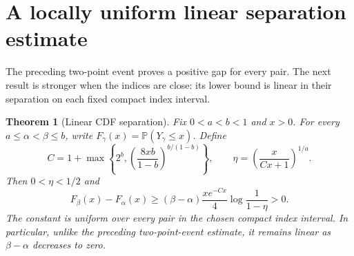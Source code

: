 \documentclass[11pt,a4paper]{article}
\newtheorem{theorem}{Theorem}[section]
\begin{document}
\section{A locally uniform linear separation estimate}\label{sec:linear}
The preceding two-point event proves a positive gap for every pair.
The next result is stronger when the indices are close: its lower bound
is linear in their separation on each fixed compact index interval.

\begin{theorem}[Linear CDF separation]\label{thm:linear}
Fix $0<a<b<1$ and $x>0$. For every
$a\leq\alpha<\beta\leq b$, write
$F_\gamma(x)=\mathbb P(Y_\gamma\leq x)$. Define
\[
 C=1+\max\left\{2^b,
       \left(\frac{8xb}{1-b}\right)^{b/(1-b)}\right\},
 \qquad
 \eta=\left(\frac{x}{Cx+1}\right)^{1/a}.
\]
Then $0<\eta<1/2$ and
\[
 F_\beta(x)-F_\alpha(x)
 \geq (\beta-\alpha)\frac{x e^{-Cx}}4
             \log\frac1{1-\eta}>0.
\]
The constant is uniform over every pair in the chosen compact index
interval. In particular, unlike the preceding two-point-event estimate,
it remains linear as $\beta-\alpha$ decreases to zero.

\end{theorem}
\end{document}
